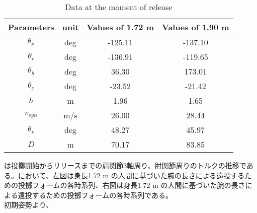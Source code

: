 \begin{table}[tb]
  \begin{center}
    \caption{Data at the moment of release}

    \begin{tabular}{c c c c}
      \hline
      Parameters & unit & Values of 1.72 m & Values of 1.90 m \\
      \hline
      $\theta_{p}$ & deg & -125.11 & -137.10 \\
      $\theta_{r}$ & deg & -136.91 & -119.65 \\
      $\theta_{y}$ & deg  & 36.30 & 173.01 \\
      $\theta_{e}$ & deg & -23.52 & -21.42 \\
      $h$ & m & 1.96 & 1.65 \\
      $v_{syn}$ & m/s & 26.00 & 28.44 \\
      $\theta_{v}$ & deg & 48.27 & 45.97 \\
      $D$ & m & 70.17 & 83.85 \\
      \hline
    \end{tabular}
  \end{center}
\end{table}

は投擲開始からリリースまでの肩関節3軸周り、肘関節周りのトルクの推移である。において、左図は身長1.72 m の人間に基づいた腕の長さによる遠投するための投擲フォームの各時系列、右図は身長1.72 m の人間に基づいた腕の長さによる遠投するための投擲フォームの各時系列である。\\
初期姿勢より、

